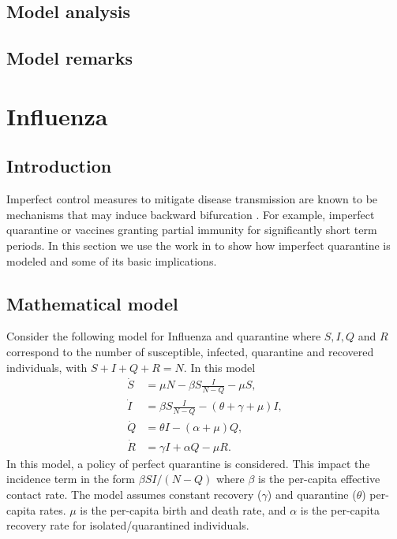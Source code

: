 \documentclass{book}\usepackage[]{graphicx}\usepackage[]{color}
\begin{document}
\subsection*{Model analysis}
\subsection*{Model remarks}


\section{Influenza}
\subsection*{Introduction}
Imperfect control measures to mitigate disease transmission are known to be mechanisms that may induce backward bifurcation \cite{gumel2012causes}. For example, imperfect quarantine or vaccines granting partial immunity for significantly short term periods.
In this section we use the work in \cite{erdem2017mathematical} to show how imperfect quarantine is modeled and some of its basic implications.

\subsection*{Mathematical model}
Consider the following model for Influenza and quarantine where $S, I, Q$ and $R$ correspond to the number of susceptible, infected, quarantine and recovered individuals, with $S+I+Q+R=N$. In this model
%
\begin{equation}
\begin{split}
  \dot{S} &= \mu N-\beta S \frac{I}{N-Q}-\mu S,\\
  \dot{I} &= \beta S \frac{I}{N-Q}-(\theta+\gamma+\mu) I,\\
  \dot{Q} &= \theta I-(\alpha+\mu) Q,\\
  \dot{R} &= \gamma I+\alpha Q-\mu R. 
  \end{split}
\end{equation}
%
In this model, a policy of perfect quarantine is considered. This impact the incidence term in the form $\beta S I /(N-Q)$ where $\beta$ is the per-capita effective contact rate.
%
The model assumes constant recovery ($\gamma$) and quarantine ($\theta$) per-capita rates. $\mu$ is the per-capita birth and death rate, and $\alpha$ is the per-capita recovery rate for isolated/quarantined individuals.
\end{document}
